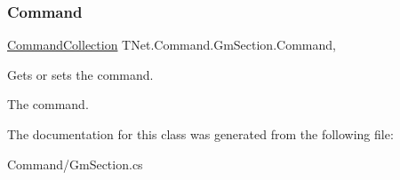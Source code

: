 \subsubsection{\texorpdfstring{Command}{Command}}
{\footnotesize\ttfamily \mbox{\hyperlink{class_t_net_1_1_command_1_1_command_collection}{Command\+Collection}} T\+Net.\+Command.\+Gm\+Section.\+Command\hspace{0.3cm}{\ttfamily [get]}, {\ttfamily [set]}}



Gets or sets the command. 

The command.

The documentation for this class was generated from the following file\+:\begin{DoxyCompactItemize}
\item 
Command/Gm\+Section.\+cs\end{DoxyCompactItemize}
